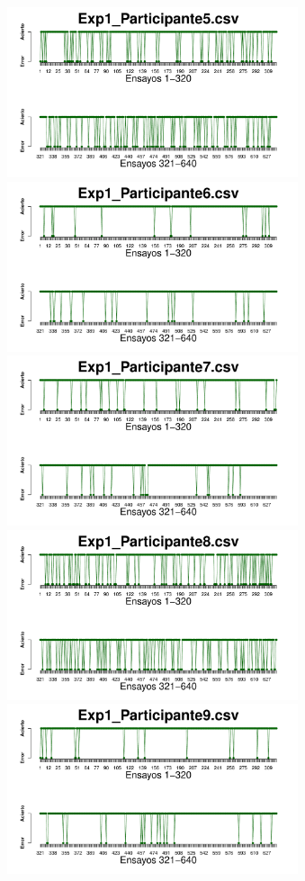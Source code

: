 \documentclass[a4paper ]{article}
\begin{document}
\begin{figure}[th]
\includegraphics[width=9cm, height=5cm]{Figures/Success_Exp1_P5} \includegraphics[width=9cm, height=5cm]{Figures/Success_Exp1_P6}
\includegraphics[width=9cm, height=5cm]{Figures/Success_Exp1_P7} \includegraphics[width=9cm, height=5cm]{Figures/Success_Exp1_P8} 
\includegraphics[width=9cm, height=5cm]{Figures/Success_Exp1_P9}
\end{figure}
\end{document}
